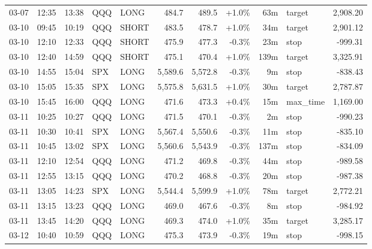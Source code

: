 \documentclass[11pt,a4paper,twoside]{article}
\begin{document}
\begin{center}
\begin{longtable}{>{\color{txtmain}}l l l l l r r r r >{\color{txtmain}}l r}
03-07 & 12:35 & 13:38 & QQQ & LONG & 484.7 & 489.5 & \textcolor{wingreen}{+1.0\%} & 63m & target & \textcolor{wingreen}{2,908.20} \\
03-10 & 09:45 & 10:19 & QQQ & SHORT & 483.5 & 478.7 & \textcolor{wingreen}{+1.0\%} & 34m & target & \textcolor{wingreen}{2,901.12} \\
03-10 & 12:10 & 12:33 & QQQ & SHORT & 475.9 & 477.3 & \textcolor{lossred}{-0.3\%} & 23m & stop & \textcolor{lossred}{-999.31} \\
03-10 & 12:40 & 14:59 & QQQ & SHORT & 475.1 & 470.4 & \textcolor{wingreen}{+1.0\%} & 139m & target & \textcolor{wingreen}{3,325.91} \\
03-10 & 14:55 & 15:04 & SPX & LONG & 5,589.6 & 5,572.8 & \textcolor{lossred}{-0.3\%} & 9m & stop & \textcolor{lossred}{-838.43} \\
03-10 & 15:05 & 15:35 & SPX & LONG & 5,575.8 & 5,631.5 & \textcolor{wingreen}{+1.0\%} & 30m & target & \textcolor{wingreen}{2,787.87} \\
03-10 & 15:45 & 16:00 & QQQ & LONG & 471.6 & 473.3 & \textcolor{wingreen}{+0.4\%} & 15m & max\_time & \textcolor{wingreen}{1,169.00} \\
03-11 & 10:25 & 10:27 & QQQ & LONG & 471.5 & 470.1 & \textcolor{lossred}{-0.3\%} & 2m & stop & \textcolor{lossred}{-990.23} \\
03-11 & 10:30 & 10:41 & SPX & LONG & 5,567.4 & 5,550.6 & \textcolor{lossred}{-0.3\%} & 11m & stop & \textcolor{lossred}{-835.10} \\
03-11 & 10:45 & 13:02 & SPX & LONG & 5,560.6 & 5,543.9 & \textcolor{lossred}{-0.3\%} & 137m & stop & \textcolor{lossred}{-834.09} \\
03-11 & 12:10 & 12:54 & QQQ & LONG & 471.2 & 469.8 & \textcolor{lossred}{-0.3\%} & 44m & stop & \textcolor{lossred}{-989.58} \\
03-11 & 12:55 & 13:15 & QQQ & LONG & 470.2 & 468.8 & \textcolor{lossred}{-0.3\%} & 20m & stop & \textcolor{lossred}{-987.38} \\
03-11 & 13:05 & 14:23 & SPX & LONG & 5,544.4 & 5,599.9 & \textcolor{wingreen}{+1.0\%} & 78m & target & \textcolor{wingreen}{2,772.21} \\
03-11 & 13:15 & 13:23 & QQQ & LONG & 469.0 & 467.6 & \textcolor{lossred}{-0.3\%} & 8m & stop & \textcolor{lossred}{-984.92} \\
03-11 & 13:45 & 14:20 & QQQ & LONG & 469.3 & 474.0 & \textcolor{wingreen}{+1.0\%} & 35m & target & \textcolor{wingreen}{3,285.17} \\
03-12 & 10:40 & 10:59 & QQQ & LONG & 475.3 & 473.9 & \textcolor{lossred}{-0.3\%} & 19m & stop & \textcolor{lossred}{-998.15} \\

\end{longtable}
\end{center}
\end{document}
